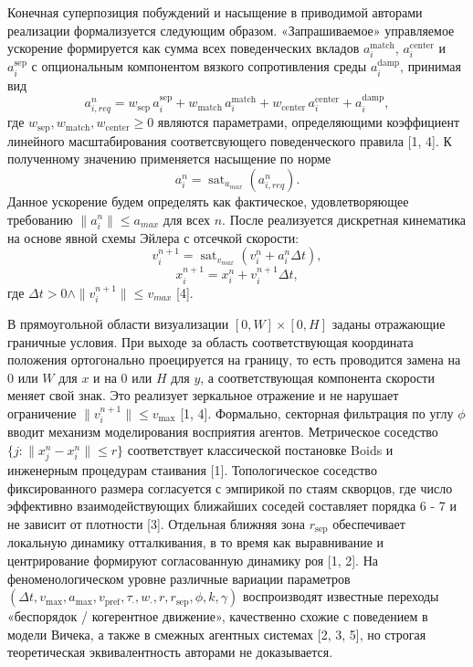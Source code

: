 \documentclass{article}
\begin{document}
Конечная суперпозиция побуждений и насыщение в приводимой авторами реализации формализуется следующим образом. «Запрашиваемое» управляемое ускорение формируется как сумма всех поведенческих вкладов $a_i^{\mathrm{match}}$, $a_i^{\mathrm{center}}$ и $a_i^{\mathrm{sep}}$ с опциональным компонентом вязкого сопротивления среды $a_i^{\mathrm{damp}}$, принимая вид
\begin{equation}
    a_{i, req}^n=
    w_{\mathrm{sep}}\,a_i^{\mathrm{sep}}+
    w_{\mathrm{match}}\,a_i^{\mathrm{match}}+
    w_{\mathrm{center}}\,a_i^{\mathrm{center}}+
    a_i^{\mathrm{damp}},
\end{equation}
где $w_{\mathrm{sep}}, w_{\mathrm{match}}, w_{\mathrm{center}} \ge 0$ являются параметрами, определяющими коэффициент линейного масштабирования соответсвующего поведенческого правила [1, 4]. К полученному значению применяется насыщение по норме
\begin{equation}
    a_i^n = \operatorname{sat}_{a_{max}} \left( a_{i, req}^n \right).
\end{equation}
Данное ускорение будем определять как фактическое, удовлетворяющее требованию $\| a_i^n \| \le a_{max}$ для всех $n$. После реализуется дискретная кинематика на основе явной схемы Эйлера с отсечкой скорости:
\begin{equation}
    v_i^{n+1} = \operatorname{sat}_{v_{max}} \left( v_i^n +a_i^n \Delta t \right),
\end{equation}
\begin{equation}
    x_i^{n+1} = x_i^n + v_i^{n+1} \Delta t,
\end{equation}
где $\Delta t >0 \wedge \| v_i^{n+1} \| \le v_{max}$ [4].

В прямоугольной области визуализации $[0, W] \times [0, H]$ заданы  отражающие граничные условия. При выходе за область соответствующая координата положения ортогонально  проецируется на границу, то есть проводится замена на $0$ или $W$ для $x$ и на $0$ или $H$ для $y$, а соответствующая компонента скорости меняет свой знак. Это реализует зеркальное отражение и не нарушает ограничение $\|v_i^{n+1}\|\le v_{\max}$ [1, 4]. Формально, секторная фильтрация по углу $\phi$ вводит механизм моделирования восприятия агентов. Метрическое соседство $\{j:\|x_j^n-x_i^n\|\le r\}$ соответствует классической постановке Boids и инженерным процедурам стаивания [1]. Топологическое соседство фиксированного размера согласуется с эмпирикой по стаям скворцов, где число эффективно взаимодействующих ближайших соседей составляет порядка 6 - 7 и не зависит от плотности [3]. Отдельная ближняя зона $r_{\mathrm{sep}}$ обеспечивает локальную динамику отталкивания, в то время как выравнивание и центрирование формируют согласованную динамику роя [1, 2]. На феноменологическом уровне различные вариации параметров $(\Delta t,v_{\max},a_{\max},v_{\mathrm{pref}},\tau_{\cdot},w_{\cdot},r,r_{\mathrm{sep}},\phi,k,\gamma)$ воспроизводят известные переходы «беспорядок / когерентное движение», качественно схожие с поведением в модели Вичека, а также в смежных агентных системах [2, 3, 5], но строгая теоретическая эквивалентность авторами не доказывается. 
\end{document}
